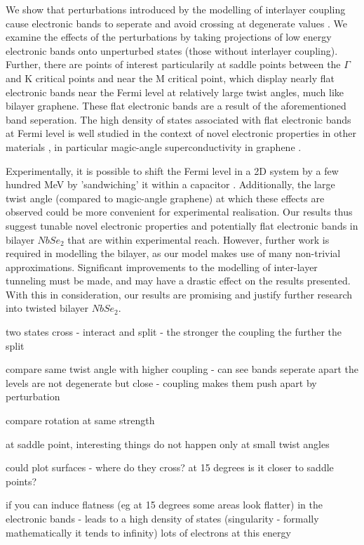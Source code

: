 \documentclass[12pt]{report} %
\begin{document}
  We show that perturbations introduced by the modelling of interlayer coupling cause electronic bands to seperate and avoid crossing at degenerate values \cite{Verhoeven1996, Cohen-Tannoudji2006}. We examine the effects of the perturbations by taking projections of low energy electronic bands onto unperturbed states (those without interlayer coupling). Further, there are points of interest particularily at saddle points between the $\Gamma$ and K critical points and near the M critical point, which display nearly flat electronic bands near the Fermi level at relatively large twist angles, much like bilayer graphene. These flat electronic bands are a result of the aforementioned band seperation. The high density of states associated with flat electronic bands at Fermi level is well studied in the context of novel electronic properties in other materials \cite{}, in particular magic-angle superconductivity in graphene \cite{}.

  Experimentally, it is possible to shift the Fermi level in a 2D system by a few hundred MeV by 'sandwiching' it within a capacitor \cite{}. Additionally, the large twist angle (compared to magic-angle graphene) at which these effects are observed could be more convenient for experimental realisation. Our results thus suggest tunable novel electronic properties and potentially flat electronic bands in bilayer $NbSe_2$ that are within experimental reach. However, further work is required in modelling the bilayer, as our model makes use of many non-trivial approximations. Significant improvements to the modelling of inter-layer tunneling must be made, and may have a drastic effect on the results presented. With this in consideration, our results are promising and justify further research into twisted bilayer $NbSe_2$.

  two states cross - interact and split - the stronger the coupling the further the split

 compare same twist angle with higher coupling - can see  bands seperate apart the levels are not degenerate but close - coupling makes them push apart by perturbation

 compare rotation at same strength 

 at saddle point, interesting things do not happen only at small twist angles

  could plot surfaces - where do they cross? at 15 degrees is it closer to saddle points?

if you can induce flatness (eg at 15 degrees some areas look flatter) in the electronic bands - leads to a high density of states (singularity - formally mathematically it tends to infinity) lots of electrons at this energy
\end{document}
